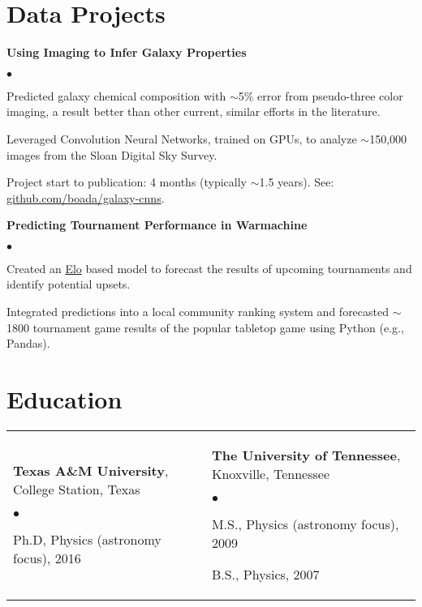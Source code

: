 \documentclass[margin,line, 11pt]{res}
\newenvironment{list2}{
  \begin{list}{$\bullet$}{%
      \setlength{\itemsep}{0in}
      \setlength{\parsep}{0in} \setlength{\parskip}{0in}
      \setlength{\topsep}{0in} \setlength{\partopsep}{0in}
      \setlength{\leftmargin}{0.2in}}}{\end{list}}
\begin{document}
\begin{resume}
\section{Data Projects}
\textbf{Using Imaging to Infer Galaxy Properties}\newline
    \begin{list2}
    	\vspace*{-5mm}
      \item Predicted galaxy chemical composition with $\sim$5\% error from pseudo-three color imaging, a result better than other current, similar efforts in the literature.
    	\item Leveraged Convolution Neural Networks, trained on GPUs, to analyze $\sim$150,000 images from the Sloan Digital Sky Survey.
      \item Project start to publication: 4 months (typically $\sim$1.5 years). See: \href{https://github.com/boada/galaxy-cnns}{github.com/boada/galaxy-cnns}.
    \end{list2}
    \vspace*{-3mm}

\textbf{Predicting Tournament Performance in Warmachine}\newline
    \begin{list2}
    	\vspace*{-5mm}
    	\item Created an \href{https://en.wikipedia.org/wiki/Elo_rating_system}{Elo} based model to forecast the results of upcoming tournaments and identify potential upsets.
    	\item Integrated predictions into a local community ranking system and forecasted $\sim$1800 tournament game results of the popular tabletop game using Python (e.g., Pandas).
    \end{list2}
\vspace*{-1mm}

\section{Education}
\begin{tabular}{@{}p{3in}p{3in}}
  \textbf{Texas A\&M University}, College Station, Texas
  \begin{list2}
  	\item Ph.D, Physics (astronomy focus), 2016
  \end{list2} &
  \textbf{The University of Tennessee}, Knoxville, Tennessee
  \begin{list2}
  	\item M.S., Physics (astronomy focus), 2009
  	\item B.S., Physics, 2007
  \end{list2} \\
\end{tabular}
\vspace*{-4mm}

\end{resume}
\end{document}
